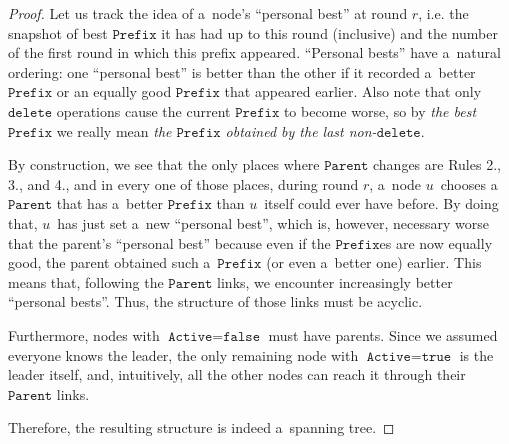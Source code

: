 \documentclass{article}
\begin{document}
\begin{proof}
Let us track the idea of a~node's ``personal best'' at round \(r\), i.e. the snapshot of best \(\texttt{Prefix}\) it has had up to this round (inclusive) and the number of the first round in which this prefix appeared. ``Personal bests'' have a~natural ordering: one ``personal best'' is better than the other if it recorded a~better \(\texttt{Prefix}\) or an equally good \(\texttt{Prefix}\) that appeared earlier. Also note that only \(\texttt{delete}\) operations cause the current \(\texttt{Prefix}\) to become worse, so by \emph{the best \(\texttt{Prefix}\)} we really mean \emph{the \(\texttt{Prefix}\) obtained by the last non-\(\texttt{delete}\)}.

By construction, we see that the only places where \(\texttt{Parent}\) changes are Rules 2., 3., and 4., and in every one of those places, during round \(r\), a~node \(u\)~chooses a~\(\texttt{Parent}\) that has a~better \(\texttt{Prefix}\) than \(u\)~itself could ever have before. By doing that, \(u\)~has just set a~new ``personal best'', which is, however, necessary worse that the parent's ``personal best'' because even if the \(\texttt{Prefix}\)es are now equally good, the parent obtained such a~\(\texttt{Prefix}\) (or even a~better one) earlier. This means that, following the \(\texttt{Parent}\) links, we encounter increasingly better ``personal bests''. Thus, the structure of those links must be acyclic.

Furthermore, nodes with \(\texttt{Active} = \texttt{false}\) must have parents. Since we assumed everyone knows the leader, the only remaining node with \(\texttt{Active} = \texttt{true}\) is the leader itself, and, intuitively, all the other nodes can reach it through their \(\texttt{Parent}\) links.

Therefore, the resulting structure is indeed a~spanning tree.
\end{proof}
\end{document}
